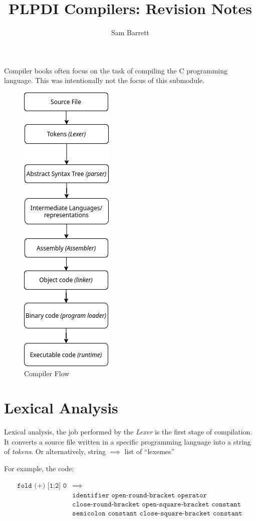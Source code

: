 \documentclass{article}
\title{PLPDI Compilers: Revision Notes}
\author{Sam Barrett}
\renewcommand{\i}[1]{\textit{#1}}
\begin{document}
\maketitle

Compiler books often focus on the task of compiling the C programming language. This was intentionally not the focus of this submodule.

\begin{figure}[htpb]
    \centering
    \includegraphics[width=0.25\linewidth]{CompilerFlow.png}
    \caption{Compiler Flow}%
    \label{fig:compFlow}
\end{figure}
\section{Lexical Analysis}

Lexical analysis, the job performed by the \textit{Lexer} is the first stage of compilation. It converts a source file written in a specific programming language into a string of \i{tokens}. Or alternatively, string $\implies$ list of ``lexemes''

For example, the code:


\begin{align*}
    \texttt{fold (+) [1;2] 0} &\implies \\ 
                              &\texttt{identifier open-round-bracket operator } \\ 
                              &\texttt{close-round-bracket open-square-bracket constant } \\ &\texttt{semicolon constant close-square-bracket constant}
\end{align*}
\end{document}
